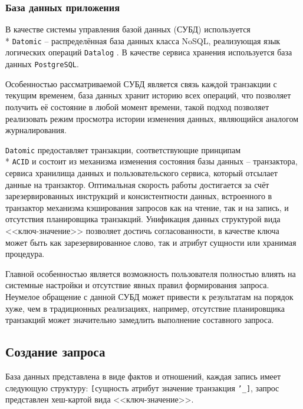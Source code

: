 \subsubsection{База данных приложения}

В качестве системы управления базой данных\cite{subd} (СУБД) используется \\* \texttt{Datomic}\cite{datomic} -- распределённая база данных класса NoSQL\cite{nosql}, реализующая язык логических операций \texttt{Datalog} \cite{datalog}. В качестве сервиса хранения используется база данных\cite{database} \texttt{PostgreSQL}\cite{postgresql}.

Особенностью рассматриваемой СУБД является связь каждой транзакции с текущим временем, база данных хранит историю всех операций, что позволяет получить её состояние в любой момент времени, такой подход позволяет реализовать режим просмотра истории изменения данных, являющийся аналогом журналирования.

\texttt{Datomic} предоставляет транзакции, соответствующие принципам \\* \texttt{ACID}\cite{acid} и состоит из механизма изменения состояния базы данных -- транзактора, сервиса хранилища данных и пользовательского сервиса, который отсылает данные на транзактор. Оптимальная скорость работы достигается за счёт зарезервированных инструкций и консистентности данных, встроенного в транзактор механизма кэширования запросов как на чтение, так и на запись, и отсутствия планировщика транзакций. Унификация данных структурой вида <<ключ-значение>> позволяет достичь согласованности, в качестве ключа может быть как зарезервированное слово, так и атрибут сущности или хранимая процедура.

Главной особенностью является возможность пользователя полностью влиять на системные настройки и отсутствие явных правил формирования запроса. Неумелое обращение с данной СУБД может привести к результатам на порядок хуже, чем в традиционных реализациях, например, отсутствие планировщика транзакций может значительно замедлить выполнение составного запроса.

\subsection{Создание запроса}

База данных представлена в виде фактов и отношений\cite{datomic-facts}, каждая запись имеет следующую структуру: \texttt{[}сущность атрибут значение транзакция \texttt{'\_]}, запрос представлен хеш-картой\cite{hash-map} вида <<ключ-значение>>.

